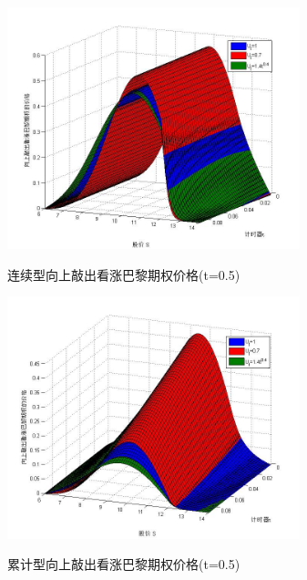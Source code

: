 \documentclass{ctexart} %
\begin{document}
\begin{figure}[H]
\label{mg2}
\begin{minipage}{0.48\linewidth}
\includegraphics[width=8.5cm]{code/mg2.jpg}
\caption{连续型向上敲出看涨巴黎期权价格(t=0.5)}
\end{minipage}
\begin{minipage}{0.48\linewidth}
\label{mc2}
\includegraphics[width=8.5cm]{code/mc2.jpg}
\caption{累计型向上敲出看涨巴黎期权价格(t=0.5)}
\end{minipage}
\end{figure}
\end{document}
